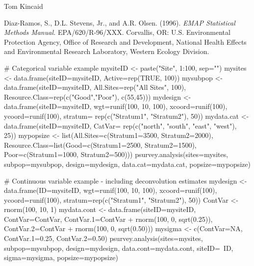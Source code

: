 \begin{Author}\relax
Tom Kincaid 
\end{Author}
\begin{References}\relax
Diaz-Ramos, S., D.L. Stevens, Jr., and A.R. Olsen. (1996).  \emph{EMAP
Statistical Methods Manual.} EPA/620/R-96/XXX.  Corvallis, OR: U.S.
Environmental Protection Agency, Office of Research and Development, National
Health Effects and Environmental Research Laboratory, Western Ecology
Division.
\end{References}
\begin{SeeAlso}\relax
{}
\end{SeeAlso}
\begin{Examples}
\begin{ExampleCode}
# Categorical variable example
mysiteID <- paste("Site", 1:100, sep="")
mysites <- data.frame(siteID=mysiteID, Active=rep(TRUE, 100))
mysubpop <- data.frame(siteID=mysiteID, All.Sites=rep("All Sites", 100),
   Resource.Class=rep(c("Good","Poor"), c(55,45)))
mydesign <- data.frame(siteID=mysiteID, wgt=runif(100, 10,
   100), xcoord=runif(100), ycoord=runif(100), stratum= rep(c("Stratum1",
   "Stratum2"), 50))
mydata.cat <- data.frame(siteID=mysiteID, CatVar= rep(c("north", "south",
   "east", "west"), 25))
mypopsize <- list(All.Sites=c(Stratum1=3500, Stratum2=2000),
   Resource.Class=list(Good=c(Stratum1=2500, Stratum2=1500),
   Poor=c(Stratum1=1000, Stratum2=500)))
psurvey.analysis(sites=mysites, subpop=mysubpop, design=mydesign,
   data.cat=mydata.cat, popsize=mypopsize)

# Continuous variable example - including deconvolution estimates
mydesign <- data.frame(ID=mysiteID, wgt=runif(100, 10, 100),
   xcoord=runif(100), ycoord=runif(100), stratum=rep(c("Stratum1",
   "Stratum2"), 50))
ContVar <- rnorm(100, 10, 1)
mydata.cont <- data.frame(siteID=mysiteID, ContVar=ContVar,
   ContVar.1=ContVar + rnorm(100, 0, sqrt(0.25)),
   ContVar.2=ContVar + rnorm(100, 0, sqrt(0.50)))
mysigma <- c(ContVar=NA, ContVar.1=0.25, ContVar.2=0.50)
psurvey.analysis(sites=mysites, subpop=mysubpop, design=mydesign,
   data.cont=mydata.cont, siteID=~ID, sigma=mysigma,
   popsize=mypopsize)
\end{ExampleCode}
\end{Examples}


